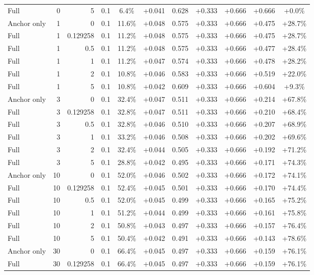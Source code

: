 \begin{table}[htbp]
\begin{tabular}{lrrrccccccc}
Full & 0 & 5 & 0.1 & 6.4\% & +0.041 & 0.628 & +0.333 & +0.666 & +0.666 & +0.0\% \\
Anchor only & 1 & 0 & 0.1 & 11.6\% & +0.048 & 0.575 & +0.333 & +0.666 & +0.475 & +28.7\% \\
Full & 1 & 0.129258 & 0.1 & 11.2\% & +0.048 & 0.575 & +0.333 & +0.666 & +0.475 & +28.7\% \\
Full & 1 & 0.5 & 0.1 & 11.2\% & +0.048 & 0.575 & +0.333 & +0.666 & +0.477 & +28.4\% \\
Full & 1 & 1 & 0.1 & 11.2\% & +0.047 & 0.574 & +0.333 & +0.666 & +0.478 & +28.2\% \\
Full & 1 & 2 & 0.1 & 10.8\% & +0.046 & 0.583 & +0.333 & +0.666 & +0.519 & +22.0\% \\
Full & 1 & 5 & 0.1 & 10.8\% & +0.042 & 0.609 & +0.333 & +0.666 & +0.604 & +9.3\% \\
Anchor only & 3 & 0 & 0.1 & 32.4\% & +0.047 & 0.511 & +0.333 & +0.666 & +0.214 & +67.8\% \\
Full & 3 & 0.129258 & 0.1 & 32.8\% & +0.047 & 0.511 & +0.333 & +0.666 & +0.210 & +68.4\% \\
Full & 3 & 0.5 & 0.1 & 32.8\% & +0.046 & 0.510 & +0.333 & +0.666 & +0.207 & +68.9\% \\
Full & 3 & 1 & 0.1 & 33.2\% & +0.046 & 0.508 & +0.333 & +0.666 & +0.202 & +69.6\% \\
Full & 3 & 2 & 0.1 & 32.4\% & +0.044 & 0.505 & +0.333 & +0.666 & +0.192 & +71.2\% \\
Full & 3 & 5 & 0.1 & 28.8\% & +0.042 & 0.495 & +0.333 & +0.666 & +0.171 & +74.3\% \\
Anchor only & 10 & 0 & 0.1 & 52.0\% & +0.046 & 0.502 & +0.333 & +0.666 & +0.172 & +74.1\% \\
Full & 10 & 0.129258 & 0.1 & 52.4\% & +0.045 & 0.501 & +0.333 & +0.666 & +0.170 & +74.4\% \\
Full & 10 & 0.5 & 0.1 & 52.0\% & +0.045 & 0.499 & +0.333 & +0.666 & +0.165 & +75.2\% \\
Full & 10 & 1 & 0.1 & 51.2\% & +0.044 & 0.499 & +0.333 & +0.666 & +0.161 & +75.8\% \\
Full & 10 & 2 & 0.1 & 50.8\% & +0.043 & 0.497 & +0.333 & +0.666 & +0.157 & +76.4\% \\
Full & 10 & 5 & 0.1 & 50.4\% & +0.042 & 0.491 & +0.333 & +0.666 & +0.143 & +78.6\% \\
Anchor only & 30 & 0 & 0.1 & 66.4\% & +0.045 & 0.497 & +0.333 & +0.666 & +0.159 & +76.1\% \\
Full & 30 & 0.129258 & 0.1 & 66.4\% & +0.045 & 0.497 & +0.333 & +0.666 & +0.159 & +76.1\% \\

\end{tabular}
\end{table}
